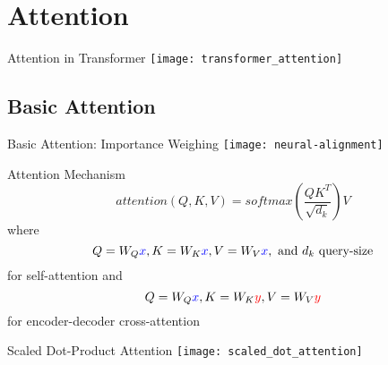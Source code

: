 \section{Attention}

\begin{frame}[c]{Attention in Transformer}
    \texttt{[image: transformer\_attention]}
\end{frame}


\subsection{Basic Attention}

\begin{frame}[c]{Basic Attention: Importance Weighing}
    \texttt{[image: neural-alignment]} \\
\end{frame}

\begin{frame}[c]{Attention Mechanism}
    \large
    $$attention(Q, K, V) = softmax(\frac{QK^T}{\sqrt{d_k}})V$$
    \pause
    where
    $$Q = W_Q\textcolor{blue}{x}, K = W_K\textcolor{blue}{x}, V = W_V\textcolor{blue}{x}, \text{ and } d_k \text{ query-size}$$
    for self-attention \pause and
    $$Q = W_Q\textcolor{blue}{x}, K = W_K\textcolor{red}{y}, V = W_V\textcolor{red}{y}$$
    for encoder-decoder cross-attention
\end{frame}


\begin{frame}[c]{Scaled Dot-Product Attention}
    \texttt{[image: scaled\_dot\_attention]}
\end{frame}


